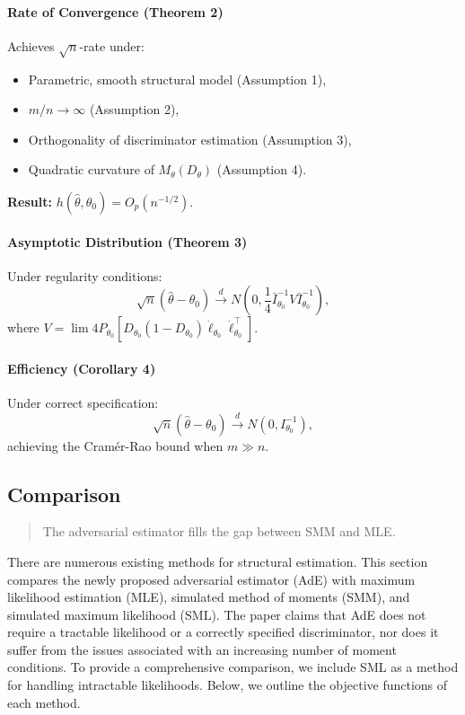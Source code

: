 \documentclass[12pt]{article}
\begin{document}
\paragraph{Rate of Convergence (Theorem 2)} Achieves \(\sqrt{n}\)-rate under:
\begin{itemize}
    \item Parametric, smooth structural model (Assumption 1),
    \item \(m/n \to \infty\) (Assumption 2),
    \item Orthogonality of discriminator estimation (Assumption 3),
    \item Quadratic curvature of \(M_\theta(D_\theta)\) (Assumption 4).
\end{itemize}
\textbf{Result:} \(h(\hat{\theta}, \theta_0) = O_p(n^{-1/2})\).

\paragraph{Asymptotic Distribution (Theorem 3)} Under regularity conditions:
\[
    \sqrt{n}(\hat{\theta} - \theta_0) \xrightarrow{d} N\left(0, \frac{1}{4} \bar{I}_{\theta_0}^{-1} V \bar{I}_{\theta_0}^{-1}\right),
\]
where \(V = \lim 4P_{\theta_0}[D_{\theta_0}(1 -
        D_{\theta_0})\dot{\ell}_{\theta_0}\dot{\ell}_{\theta_0}^\top]\).

\paragraph{Efficiency (Corollary 4)} Under correct specification:
\[
    \sqrt{n}(\hat{\theta} - \theta_0) \xrightarrow{d} N(0, I_{\theta_0}^{-1}),
\]
achieving the Cramér-Rao bound when \(m \gg n\).

\subsection{Comparison} \label{subsec:comparison}
\begin{quote}
    The adversarial estimator fills the gap between SMM and MLE.
\end{quote}

There are numerous existing methods for structural estimation. This section
compares the newly proposed adversarial estimator (AdE) with maximum likelihood
estimation (MLE), simulated method of moments (SMM), and simulated maximum
likelihood (SML). The paper claims that AdE does not require a tractable
likelihood or a correctly specified discriminator, nor does it suffer from the
issues associated with an increasing number of moment conditions. To provide a
comprehensive comparison, we include SML as a method for handling intractable
likelihoods. Below, we outline the objective functions of each method.
\end{document}
